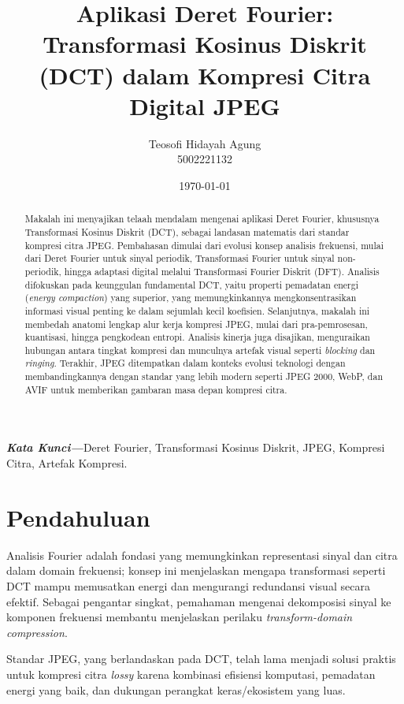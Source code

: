 \documentclass[a4paper]{article}
\title{\textbf{Aplikasi Deret Fourier: Transformasi Kosinus Diskrit (DCT) dalam Kompresi Citra Digital JPEG}}
\author{Teosofi Hidayah Agung\\5002221132}
\date{\today}
\newcommand{\keywords}[1]{%
  \begin{center}
  \textbf{\textit{Kata Kunci---}}#1
  \end{center}
}
\begin{document}
\maketitle

\begin{abstract}
  Makalah ini menyajikan telaah mendalam mengenai aplikasi Deret Fourier, khususnya Transformasi Kosinus Diskrit (DCT), sebagai landasan matematis dari standar kompresi citra JPEG. Pembahasan dimulai dari evolusi konsep analisis frekuensi, mulai dari Deret Fourier untuk sinyal periodik, Transformasi Fourier untuk sinyal non-periodik, hingga adaptasi digital melalui Transformasi Fourier Diskrit (DFT). Analisis difokuskan pada keunggulan fundamental DCT, yaitu properti pemadatan energi (\textit{energy compaction}) yang superior, yang memungkinkannya mengkonsentrasikan informasi visual penting ke dalam sejumlah kecil koefisien. Selanjutnya, makalah ini membedah anatomi lengkap alur kerja kompresi JPEG, mulai dari pra-pemrosesan, kuantisasi, hingga pengkodean entropi. Analisis kinerja juga disajikan, menguraikan hubungan antara tingkat kompresi dan munculnya artefak visual seperti \textit{blocking} dan \textit{ringing}. Terakhir, JPEG ditempatkan dalam konteks evolusi teknologi dengan membandingkannya dengan standar yang lebih modern seperti JPEG 2000, WebP, dan AVIF untuk memberikan gambaran masa depan kompresi citra.
\end{abstract}

\keywords{Deret Fourier, Transformasi Kosinus Diskrit, JPEG, Kompresi Citra, Artefak Kompresi.}

\section{Pendahuluan}
Analisis Fourier adalah fondasi yang memungkinkan representasi sinyal dan citra dalam domain frekuensi; konsep ini menjelaskan mengapa transformasi seperti DCT mampu memusatkan energi dan mengurangi redundansi visual secara efektif. Sebagai pengantar singkat, pemahaman mengenai dekomposisi sinyal ke komponen frekuensi membantu menjelaskan perilaku \textit{transform-domain compression}.

Standar JPEG, yang berlandaskan pada DCT, telah lama menjadi solusi praktis untuk kompresi citra \textit{lossy} karena kombinasi efisiensi komputasi, pemadatan energi yang baik, dan dukungan perangkat keras/ekosistem yang luas.
\end{document}
